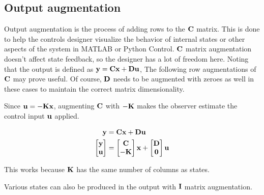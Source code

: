 \subsection{Output augmentation}

Output augmentation is the process of adding rows to the $\mathbf{C}$ matrix. This
is done to help the controls designer visualize the behavior of internal states
or other aspects of the system in MATLAB or Python Control. $\mathbf{C}$ matrix
augmentation doesn't affect state feedback, so the designer has a lot of freedom
here. Noting that the output is defined as
$\mathbf{y} = \mathbf{C}\mathbf{x} + \mathbf{D}\mathbf{u}$, The following row augmentations of
$\mathbf{C}$ may prove useful. Of course, $\mathbf{D}$ needs to be augmented with
zeroes as well in these cases to maintain the correct matrix dimensionality.

Since $\mathbf{u} = -\mathbf{K}\mathbf{x}$, augmenting $\mathbf{C}$ with $-\mathbf{K}$ makes
the observer estimate the control input $\mathbf{u}$ applied.

\begin{align*}
  \mathbf{y} &= \mathbf{C}\mathbf{x} + \mathbf{D}\mathbf{u} \\
  \begin{bmatrix}
    \mathbf{y} \\
    \mathbf{u}
  \end{bmatrix} &=
  \begin{bmatrix}
    \mathbf{C} \\
    -\mathbf{K}
  \end{bmatrix}
  \mathbf{x} +
  \begin{bmatrix}
    \mathbf{D} \\
    \mathbf{0}
  \end{bmatrix}
  \mathbf{u}
\end{align*}

This works because $\mathbf{K}$ has the same number of columns as states.

Various states can also be produced in the output with $\mathbf{I}$ matrix
augmentation.
